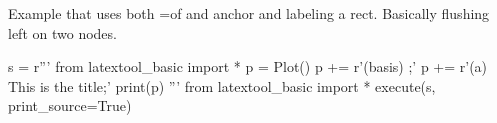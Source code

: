 \newpage
Example that uses both =of and anchor and labeling a rect.
Basically flushing left on two nodes.
\begin{python}
s = r'''
from latextool_basic import *
p = Plot()
p += r'\node[minimum width=5cm, draw, rectangle] (basis) {};'
p += r'\node[above=0.2cm of basis.north west, anchor=south west, rectangle, minimum width=1cm, inner sep=0cm] (a) {This is the title};'
print(p)
'''
from latextool_basic import *
execute(s, print_source=True)
\end{python}


\newpage

